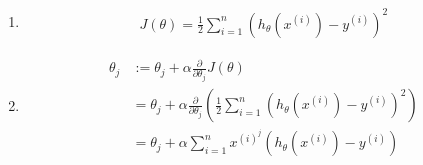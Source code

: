 \begin{answer}
\begin{enumerate}
\item
\begin{align*}
J(\theta)=\frac{1}{2}\sum_{i=1}^{n}(h_\theta(x^{(i)})-y^{(i)})^2
\end{align*}
\item
\begin{align*}
\theta_j&:=\theta_j+\alpha\frac{\partial}{\partial\theta_j}J(\theta)\\
&=\theta_j+\alpha\frac{\partial}{\partial\theta_j}\left(\frac{1}{2}\sum_{i=1}^{n}(h_\theta(x^{(i)})-y^{(i)})^2\right)\\
&=\theta_j+\alpha \sum_{i=1}^{n}x^{(i)^j}(h_\theta(x^{(i)})-y^{(i)})
\end{align*}
\end{enumerate}
\end{answer}
